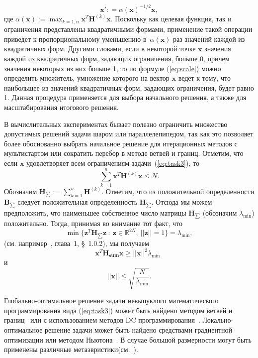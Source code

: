 \begin{equation}
    \textbf{x}': =\alpha(\textbf{x})^{-1/2} \textbf{x} ,
    \label{eq:scale}
\end{equation}
где $\alpha(\textbf{x}):=\max_{k=\overline{1,n}} \textbf{x}^T \textbf{H}^{(k)}\textbf{x}$. Поскольку как целевая функция, так и ограничения представлены квадратичными формами, применение такой операции приведет к пропорциональному уменьшению в~$\alpha(\textbf{x})$ раз значений каждой из квадратичных форм. Другими словами, если в некоторой точке $\textbf{x}$ значения каждой из квадратичных форм, задающих ограничения, больше 0, причем значения некоторых из них больше 1, то по формуле (\ref{eq:scale}) можно определить множитель, умножение которого на вектор $\textbf{x}$ ведет к тому, что наибольшее из значений квадратичных форм, задающих ограничения, будет равно 1. Данная процедура применяется для выбора начального решения, а также для масштабирования итогового решения.


В вычислительных экспериментах бывает полезно ограничить множество допустимых решений задачи шаром или параллелепипедом, так как это позволяет более обоснованно выбрать начальное решение для итерационных методов с мультистартом или сократить перебор в методе ветвей и границ. Отметим, что если $\textbf{x}$ удовлетворяет всем ограничениям задачи~(\ref{eq:task3}), то
$$
\sum_{k=1}^{n} \textbf{x}^T \textbf{H}^{(k)}  \textbf{x} \le N.
$$
Обозначим $\textbf{H}_{\sum}:= \sum_{k=1}^{n} \textbf{H}^{(k)}$. Отметим, что из положительной определенности $\textbf{B}_{\sum}$ следует положительная определенность $\textbf{H}_{\sum}$. Отсюда мы можем предположить, что наименьшее собственное число матрицы
$\textbf{H}_{\sum}$ (обозначим $\lambda_{\min}$) положительно. Тогда, принимая во внимание тот факт, что
$$
\min\{\textbf{z}^T \textbf{H}_{\sum} \textbf{z} \ : \ \textbf{z}\in
\mathbb{R}^{2N}, \ ||\textbf{z}|| =1\} = \lambda_{\min},
$$
(см. например~\cite{horn:matrix}, глава~1, \S~1.0.2), мы получаем
$$
\textbf{x}^T \textbf{H}_\textbf{sum} \textbf{x} \ge ||\textbf{x}||^2
\lambda_{\min}\ \
$$
и
\begin{equation} \label{eqn:bound}
||\textbf{x}||\le \sqrt{\frac{N}{\lambda_{\min}}}.
\end{equation}

Глобально-оптимальное решение задачи невыпуклого математического программирования вида (\ref{eq:task3}) может быть найдено методом
ветвей и границ~\cite{horst:global,tawarmalani:global} или с использованием методов DC программирования~\cite{horst:handbook,strekalovsky:global}. Локально-оптимальное решение задачи может быть найдено средствами градиентной оптимизации или методом Ньютона~\cite{himmelblau:nlp}. В случае большой размерности могут быть применены различные метаэвристики(см.~\cite{eberhart:swarm,storn:de}).

